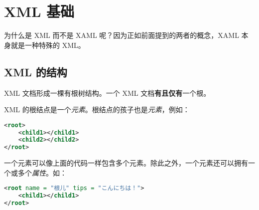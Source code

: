 




\section{XML 基础}

为什么是 XML 而不是 XAML 呢？因为正如前面提到的两者的概念，XAML 本身就是一种特殊的 XML。

\subsection{XML 的结构\cite{XMLrunoob1}\cite{XMLrunoob2}\cite{XMLrunoob3}}

XML 文档形成一棵有根树结构。一个 XML 文档\textbf{有且仅有}一个根。

XML 的根结点是一个\emph{元素}。根结点的孩子也是\emph{元素}，例如：
\begin{lstlisting}[language = xml]
<root>
    <child1></child1>
    <child2></child2>
</root>
\end{lstlisting}

一个元素可以像上面的代码一样包含多个元素。除此之外，一个元素还可以拥有一个或多个\emph{属性}。如：
\begin{lstlisting}[language = xml]
<root name = "根儿" tips = "こんにちは！">
    <child1></child1>
</root>
\end{lstlisting}

